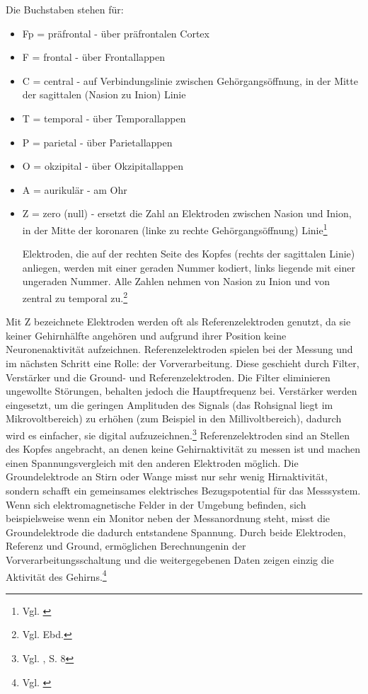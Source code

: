 Die Buchstaben stehen für:
\begin{itemize}

    \item Fp = präfrontal - über präfrontalen Cortex
    \item F = frontal - über Frontallappen
    \item C = central - auf Verbindungslinie zwischen Gehörgangsöffnung, in der Mitte der sagittalen (Nasion zu Inion) Linie
    \item T = temporal - über Temporallappen
    \item P = parietal - über Parietallappen
    \item O = okzipital - über Okzipitallappen
    \item A = aurikulär - am Ohr
    \item Z = zero (null) - ersetzt die Zahl an Elektroden zwischen Nasion und Inion, in der Mitte der koronaren (linke zu rechte Gehörgangsöffnung) Linie\footnote{Vgl. \cite{doccheck_1020-system}}

Elektroden, die auf der rechten Seite des Kopfes (rechts der sagittalen Linie) anliegen, werden mit einer geraden Nummer kodiert, links liegende mit einer ungeraden Nummer. Alle Zahlen nehmen von Nasion zu Inion und von zentral zu temporal zu.\footnote{Vgl. Ebd.}
    
\end{itemize}
Mit Z bezeichnete Elektroden werden oft als Referenzelektroden genutzt, da sie keiner Gehirnhälfte angehören und aufgrund ihrer Position keine Neuronenaktivität aufzeichnen.
Referenzelektroden spielen bei der Messung und im nächsten Schritt eine Rolle: der Vorverarbeitung. Diese geschieht durch Filter, Verstärker und die Ground- und Referenzelektroden.
Die Filter eliminieren ungewollte Störungen, behalten jedoch die Hauptfrequenz bei. Verstärker werden eingesetzt, um die geringen Amplituden des Signals (das Rohsignal liegt im Mikrovoltbereich) zu erhöhen (zum Beispiel in den Millivoltbereich), dadurch wird es einfacher, sie digital aufzuzeichnen.\footnote{Vgl. \cite{qin2023}, S. 8} Referenzelektroden sind an Stellen des Kopfes angebracht, an denen keine Gehirnaktivität zu messen ist und machen einen Spannungsvergleich mit den anderen Elektroden möglich. Die Groundelektrode an Stirn oder Wange misst nur sehr wenig Hirnaktivität, sondern schafft ein gemeinsames elektrisches Bezugspotential für das Messsystem. Wenn sich elektromagnetische Felder in der Umgebung befinden, sich beispielsweise wenn ein Monitor neben der Messanordnung steht, misst die Groundelektrode die dadurch entstandene Spannung. Durch beide Elektroden, Referenz und Ground, ermöglichen Berechnungenin der Vorverarbeitungsschaltung und die weitergegebenen Daten zeigen einzig die Aktivität des Gehirns.\footnote{Vgl. \cite{biopac_reference_ground}}

